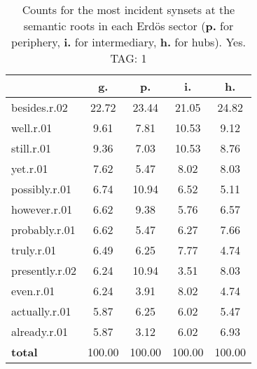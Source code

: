 \begin{table}[h!]
\begin{center}
\begin{tabular}{| l || c | c | c | c |}\hline
 & {\bf g.} & {\bf p.} & {\bf i.} & {\bf h.} \\\hline\hline
besides.r.02 & 22.72  & 23.44  & 21.05  & 24.82 \\\hline
well.r.01 & 9.61  & 7.81  & 10.53  & 9.12 \\\hline
still.r.01 & 9.36  & 7.03  & 10.53  & 8.76 \\\hline
yet.r.01 & 7.62  & 5.47  & 8.02  & 8.03 \\\hline
possibly.r.01 & 6.74  & 10.94  & 6.52  & 5.11 \\\hline
however.r.01 & 6.62  & 9.38  & 5.76  & 6.57 \\\hline
probably.r.01 & 6.62  & 5.47  & 6.27  & 7.66 \\\hline
truly.r.01 & 6.49  & 6.25  & 7.77  & 4.74 \\\hline
presently.r.02 & 6.24  & 10.94  & 3.51  & 8.03 \\\hline
even.r.01 & 6.24  & 3.91  & 8.02  & 4.74 \\\hline
actually.r.01 & 5.87  & 6.25  & 6.02  & 5.47 \\\hline
already.r.01 & 5.87  & 3.12  & 6.02  & 6.93 \\\hline\hline
{{\bf total}} & 100.00  & 100.00  & 100.00  & 100.00 \\\hline
\end{tabular}
\caption{Counts for the most incident synsets at the semantic roots in each Erd\"os sector ({\bf p.} for periphery, {\bf i.} for intermediary, {\bf h.} for hubs). Yes. TAG: 1}
\end{center}
\end{table}